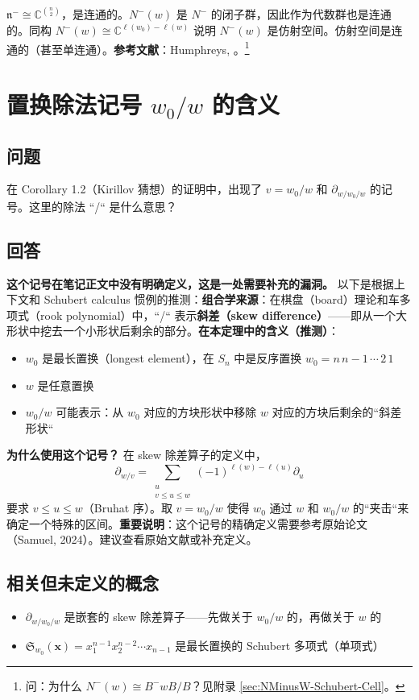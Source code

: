 $\mathfrak{n}^{-} \cong \mathbb{C}^{\binom{n}{2}}$，是连通的。$N^{-}(w)$ 是 $N^{-}$ 的闭子群，因此作为代数群也是连通的。同构 $N^{-}(w) \cong \mathbb{C}^{\ell(w_0)-\ell(w)}$ 说明 $N^{-}(w)$ 是仿射空间。仿射空间是连通的（甚至单连通）。\textbf{参考文献}：Humphreys, \cite[Section 28]{humphreys1975}。\footnote{问：为什么 $N^{-}(w) \cong B^{-}wB/B$？见附录 \cref{sec:NMinusW-Schubert-Cell}。}
\section{置换除法记号 $w_0 / w$ 的含义}\label{sec:permutation-division}
\subsection{问题}
在 Corollary 1.2（Kirillov 猜想）的证明中，出现了 $v = w_0 / w$ 和 $\partial_{w/w_0/w}$ 的记号。这里的除法 ``/`` 是什么意思？
\subsection{回答}
\textbf{这个记号在笔记正文中没有明确定义，这是一处需要补充的漏洞。} 以下是根据上下文和 Schubert calculus 惯例的推测：\textbf{组合学来源}：在棋盘（board）理论和车多项式（rook polynomial）中，``/`` 表示\textbf{斜差（skew difference）}——即从一个大形状中挖去一个小形状后剩余的部分。\textbf{在本定理中的含义（推测）}：
\begin{itemize}
\item $w_0$ 是最长置换（longest element），在 $S_n$ 中是反序置换 $w_0 = n \, n\!-\!1 \, \cdots \, 2 \, 1$\item $w$ 是任意置换\item $w_0 / w$ 可能表示：从 $w_0$ 对应的方块形状中移除 $w$ 对应的方块后剩余的``斜差形状``
\end{itemize}

\textbf{为什么使用这个记号？} 在 skew 除差算子的定义中，$$\partial_{w/v} = \sum_{\substack{u \\ v \leq u \leq w}} (-1)^{\ell(w)-\ell(u)} \partial_u$$要求 $v \leq u \leq w$（Bruhat 序）。取 $v = w_0 / w$ 使得 $w_0$ 通过 $w$ 和 $w_0 / w$ 的``夹击``来确定一个特殊的区间。\textbf{重要说明}：这个记号的精确定义需要参考原始论文（Samuel, 2024）。建议查看原始文献或补充定义。
\subsection{相关但未定义的概念}
\begin{itemize}
\item $\partial_{w/w_0/w}$ 是嵌套的 skew 除差算子——先做关于 $w_0/w$ 的，再做关于 $w$ 的\item $\mathfrak{S}_{w_0}(\mathbf{x}) = x_1^{n-1} x_2^{n-2} \cdots x_{n-1}$ 是最长置换的 Schubert 多项式（单项式）
\end{itemize}
